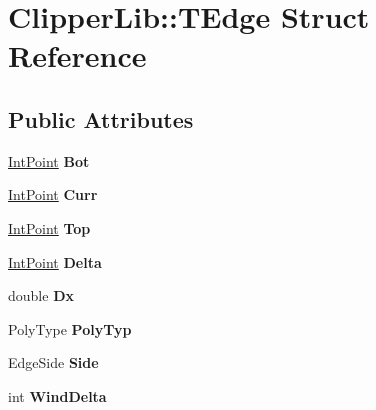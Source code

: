 \hypertarget{struct_clipper_lib_1_1_t_edge}{}\section{Clipper\+Lib\+:\+:T\+Edge Struct Reference}
\label{struct_clipper_lib_1_1_t_edge}
\subsection*{Public Attributes}
\begin{DoxyCompactItemize}
\item 
\hypertarget{struct_clipper_lib_1_1_t_edge_adddb6b117ed14437613d26cc456bb4bc}{}\label{struct_clipper_lib_1_1_t_edge_adddb6b117ed14437613d26cc456bb4bc} 
\hyperlink{struct_clipper_lib_1_1_int_point}{Int\+Point} {\bfseries Bot}
\item 
\hypertarget{struct_clipper_lib_1_1_t_edge_ad5932926d3d5d6ed6ae4bc991ed7bcec}{}\label{struct_clipper_lib_1_1_t_edge_ad5932926d3d5d6ed6ae4bc991ed7bcec} 
\hyperlink{struct_clipper_lib_1_1_int_point}{Int\+Point} {\bfseries Curr}
\item 
\hypertarget{struct_clipper_lib_1_1_t_edge_a9f09500b780f7492d8c4c511aabf1c96}{}\label{struct_clipper_lib_1_1_t_edge_a9f09500b780f7492d8c4c511aabf1c96} 
\hyperlink{struct_clipper_lib_1_1_int_point}{Int\+Point} {\bfseries Top}
\item 
\hypertarget{struct_clipper_lib_1_1_t_edge_afeb7324b818fe9f667199bd18701e23c}{}\label{struct_clipper_lib_1_1_t_edge_afeb7324b818fe9f667199bd18701e23c} 
\hyperlink{struct_clipper_lib_1_1_int_point}{Int\+Point} {\bfseries Delta}
\item 
\hypertarget{struct_clipper_lib_1_1_t_edge_ace215b877c384f917d18f6c1da913959}{}\label{struct_clipper_lib_1_1_t_edge_ace215b877c384f917d18f6c1da913959} 
double {\bfseries Dx}
\item 
\hypertarget{struct_clipper_lib_1_1_t_edge_aedc0a4d8b17ae3e42555621b22af8296}{}\label{struct_clipper_lib_1_1_t_edge_aedc0a4d8b17ae3e42555621b22af8296} 
Poly\+Type {\bfseries Poly\+Typ}
\item 
\hypertarget{struct_clipper_lib_1_1_t_edge_aa7840242535b7830744f4387aa53bdfa}{}\label{struct_clipper_lib_1_1_t_edge_aa7840242535b7830744f4387aa53bdfa} 
Edge\+Side {\bfseries Side}
\item 
\hypertarget{struct_clipper_lib_1_1_t_edge_afd72e2c7b9f97706ead72907509f8bc1}{}\label{struct_clipper_lib_1_1_t_edge_afd72e2c7b9f97706ead72907509f8bc1} 
int {\bfseries Wind\+Delta}

\end{DoxyCompactItemize}

